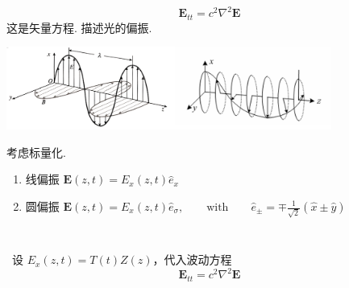\begin{frame}
 \frametitle{}
 \[\mathbf{E}_{tt} =c^2\nabla^2 \mathbf{E}\]
 这是矢量方程. 描述光的偏振. 
   \begin{center}
        \includegraphics[width=0.8\textwidth]{figs/10.png}
   \end{center}
 考虑标量化.
 \begin{enumerate}
     \item 线偏振 $\mathbf{E}(z,t) = E_x(z,t) \hat{e}_x $ 
     \item 圆偏振 $\mathbf{E}(z,t) = E_x(z,t) \hat{e}_{\sigma}, \qquad \text{with} \qquad \hat{e}_{\pm}= \mp \frac{1}{\sqrt{2}} (\hat{x} \pm \hat{y}) $
 \end{enumerate}
\end{frame}

\begin{frame}
      \frametitle{}
      ~~\\
    \解  设 $\displaystyle  E_x(z,t)=T(t)Z(z) $，代入波动方程 
    \[\mathbf{E}_{tt} =c^2\nabla^2 \mathbf{E}\]
\end{frame}

